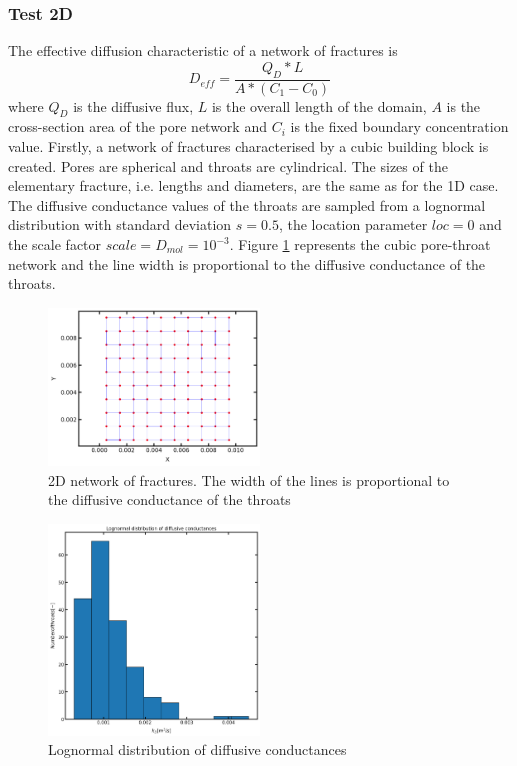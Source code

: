 \documentclass{article}
\begin{document}
\subsubsection{Test 2D}
The effective diffusion characteristic of a network of fractures is
\begin{equation}
    D_{eff}=\frac{Q_D*L}{A*(C_1-C_0)}
    \label{eq:EffDiff}
\end{equation}
where $Q_D$ is the diffusive flux, $L$ is the overall length of the domain, $A$ is the cross-section area of the pore network and $C_i$ is the fixed boundary concentration value.
Firstly, a network of fractures characterised by a cubic building block is created. Pores are spherical and throats are cylindrical. The sizes of the elementary fracture, i.e. lengths and diameters, are the same as for the 1D case. The diffusive conductance values of the throats are sampled from a lognormal distribution with standard deviation $s=0.5$, the location parameter $loc=0$ and the scale factor $scale=D_{mol}=10^{-3}$. Figure \ref{fig:Network} represents the cubic pore-throat network and the line width is proportional to the diffusive conductance of the throats.
\FloatBarrier  %
\begin{figure}[h]
    \centering
    \includegraphics[width=0.5\textwidth]{images/fromOpenPNM/rectangular2Dpn.png}
    \caption{2D network of fractures. The width of the lines is proportional to the diffusive conductance of the throats}
    \label{fig:Network}
\end{figure}
\FloatBarrier  %
\begin{figure}[h]
    \centering
    \includegraphics[width=0.5\textwidth]{images/fromOpenPNM/effDiffLognormalDist.png}
    \caption{Lognormal distribution of diffusive conductances}
    \label{fig:LogDiff}
\end{figure}
\end{document}
